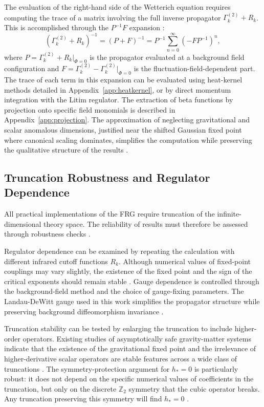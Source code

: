 \documentclass[12pt,a4paper]{article}
\begin{document}
The evaluation of the right-hand side of the Wetterich equation requires
computing the trace of a matrix involving the full inverse propagator
$\Gamma^{(2)}_k + R_k$. This is accomplished through the $P^{-1}F$ expansion
\cite{Pawlowski2007,Dupuis2021}:
\begin{equation}
(\Gamma^{(2)}_k + R_k)^{-1}
= (P + F)^{-1}
= P^{-1}\sum_{n=0}^\infty (-F P^{-1})^n,
\end{equation}
where $P = \Gamma^{(2)}_k + R_k|_{\Phi=0}$ is the propagator evaluated at
a background field configuration and $F = \Gamma^{(2)}_k - \Gamma^{(2)}_k|_{\Phi=0}$
is the fluctuation-field-dependent part. The trace of each term in this
expansion can be evaluated using heat-kernel methods detailed in
Appendix~\ref{app:heatkernel}, or by direct momentum integration with the
Litim regulator. The extraction of beta functions by projection onto specific
field monomials is described in Appendix~\ref{app:projection}. The
approximation of neglecting gravitational and scalar anomalous dimensions,
justified near the shifted Gaussian fixed point where canonical scaling
dominates, simplifies the computation while preserving the qualitative
structure of the results \cite{Pawlowski2007,Dupuis2021}.

\subsection{Truncation Robustness and Regulator Dependence}

All practical implementations of the FRG require truncation of the
infinite-dimensional theory space. The reliability of results must therefore
be assessed through robustness checks \cite{Berges2002,Dupuis2021}.

Regulator dependence can be examined by repeating the calculation with
different infrared cutoff functions $R_k$. Although numerical values of
fixed-point couplings may vary slightly, the existence of the fixed point and
the sign of the critical exponents should remain stable \cite{Berges2002}.
Gauge dependence is controlled through the background-field method and the
choice of gauge-fixing parameters. The Landau-DeWitt gauge used in this work
simplifies the propagator structure while preserving background diffeomorphism
invariance \cite{Reuter1998,Percacci2017}.

Truncation stability can be tested by enlarging the truncation to include
higher-order operators. Existing studies of asymptotically safe gravity-matter
systems indicate that the existence of the gravitational fixed point and the
irrelevance of higher-derivative scalar operators are stable features across
a wide class of truncations \cite{EichhornSchiffer2022handbook,Eichhorn2022status}.
The symmetry-protection argument for $h_* = 0$ is particularly robust: it
does not depend on the specific numerical values of coefficients in the
truncation, but only on the discrete $\mathbb{Z}_2$ symmetry that the cubic
operator breaks. Any truncation preserving this symmetry will find $h_* = 0$
\cite{EichhornLinoWagner2023}.
\end{document}
